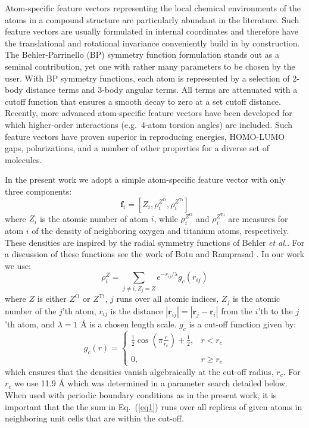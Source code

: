 \documentclass[aip,amsmath,amssymb,reprint]{revtex4-1}
\begin{document}
Atom-specific feature vectors representing the local
chemical environments of the atoms in a compound structure are
particularly abundant in the literature. Such feature vectors are usually
formulated in internal coordinates and therefore have the translational
and rotational invariance conveniently build in by construction. The Behler-Parrinello (BP)
symmetry function formulation\cite{behler_parrinello} stands out as a seminal
contribution, yet one with rather many parameters to be chosen by the
user. With BP symmetry functions, each atom is represented by a selection
of 2-body distance terms and 3-body angular terms. All terms are
attenuated with a cutoff function that ensures a smooth decay to
zero at a set cutoff distance.  Recently, more advanced atom-specific feature vectors
have been developed for which higher-order interactions (e.g.\ 4-atom torsion angles) are included.
Such feature vectors have proven superior in reproducing energies,
HOMO-LUMO gaps, polarizations, and a number of other properties for a
diverse set of molecules.\cite{baml,dihedral_representation}

In the present work we adopt a simple atom-specific
feature vector with only three components:
\begin{equation}
\mathbf{f}_i=\left[Z_i,\rho_i^{Z^\mathrm{O}},\rho_i^{Z^\mathrm{Ti}}\right]\label{eq_feature}
\end{equation}
where $Z_i$ is the atomic number of atom $i$, while
$\rho_i^{Z^\mathrm{O}}$ and $\rho_i^{Z^\mathrm{Ti}}$ are measures for
atom $i$ of the density of neighboring oxygen and titanium atoms,
respectively. These densities are inspired by the radial symmetry
functions of Behler \textit{et al.}\cite{behler_parrinello}. For a discussion of these functions see the work of Botu
and Ramprasad \cite{Botu2015}. In our work we use:
\begin{equation}
\rho_i^Z = \sum_{j\ne i,Z_j=Z} e^{-r_{ij}/\lambda}g_c(r_{ij})  \label{eq1}
\end{equation}
where $Z$ is either $Z^\mathrm{O}$ or $Z^\mathrm{Ti}$, $j$ runs over
all atomic indices, $Z_j$ is the atomic number of the $j$'th atom, $r_{ij}$ is the distance $|\mathbf r_{ij}|=|\mathbf r_j-
\mathbf r_i|$ from the $i$'th to the $j$'th atom, and
$\lambda=1$ {\AA} is a chosen length scale. $g_c$ is a cut-off
function given by:
\begin{equation}
g_c(r)=
\left\{\begin{array}{ll}
\frac{1}{2}{\cos(\pi \frac{r}{r_c})+\frac{1}{2}},&r<r_c\\
\\
0,&r\ge r_c
\end{array}
\right.
\end{equation}
which ensures that the densities vanish algebraically at the cut-off
radius, $r_c$. For $r_c$ we use 11.9 {\AA} which was determined in a parameter search detailed below.
When used with periodic boundary conditions as in the present work, it is important that the
the sum in Eq.\ (\ref{eq1}) runs over all replicas of given atoms in neighboring unit cells that are within the cut-off.
\end{document}
